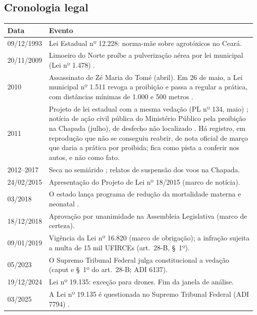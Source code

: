 \begin{apendicesenv}
\chapter{Cronologia legal}
\label{ap:cronologia}

\begin{quadro}[htb]
\caption{\label{qua:cronologia}Cronologia legal do tratamento}
\centering
\small
\begin{tabular}{@{}lp{11.2cm}@{}}
\toprule
Data & Evento \\
\midrule
09/12/1993 & Lei Estadual nº 12.228: norma-mãe sobre agrotóxicos no Ceará. \\
20/11/2009 & Limoeiro do Norte proíbe a pulverização aérea por lei municipal (Lei nº 1.478) \cite{limoeiro2009lei1478}. \\
2010 & Assassinato de Zé Maria do Tomé (abril). Em 26 de maio, a Lei municipal nº 1.511 revoga a proibição e passa a regular a prática, com distâncias mínimas de 1.000 e 500 metros \cite{limoeiro2010lei1511}. \\
2011 & Projeto de lei estadual com a mesma vedação (PL nº 134, maio) \cite{ceara2011pl134}; notícia de ação civil pública do Ministério Público pela proibição na Chapada (julho), de desfecho não localizado \cite{mpt2011apodi}. Há registro, em reprodução que não se conseguiu reabrir, de nota oficial de março que daria a prática por proibida; fica como pista a conferir nos autos, e não como fato. \\
2012--2017 & Seca no semiárido \cite{rebello2018seca}; relatos de suspensão dos voos na Chapada. \\
24/02/2015 & Apresentação do Projeto de Lei nº 18/2015 (marco de notícia). \\
03/2018 & O estado lança programa de redução da mortalidade materna e neonatal \cite{ceara2018nascer}. \\
18/12/2018 & Aprovação por unanimidade na Assembleia Legislativa (marco de certeza). \\
09/01/2019 & Vigência da Lei nº 16.820 (marco de obrigação); a infração sujeita a multa de 15 mil UFIRCEs (art.~28-B, §~1º). \\
05/2023 & O Supremo Tribunal Federal julga constitucional a vedação (caput e §~1º do art.~28-B; ADI 6137). \\
19/12/2024 & Lei nº 19.135: exceção para drones. Fim da janela de análise. \\
03/2025 & A Lei nº 19.135 é questionada no Supremo Tribunal Federal (ADI 7794) \cite{stf2025adi7794}. \\
\bottomrule
\end{tabular}
\end{quadro}
\clearpage

\end{apendicesenv}

